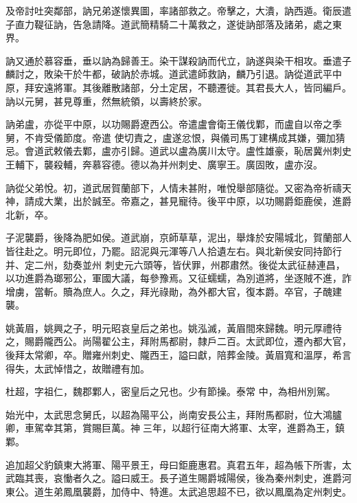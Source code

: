 \begin{pinyinscope}
 及帝討吐突鄰部，訥兄弟遂懷異圖，率諸部救之。帝擊之，大潰，訥西遁。衛辰遣子直力鞮征訥，告急請降。道武簡精騎二十萬救之，遂徙訥部落及諸弟，處之東界。



 訥又通於慕容垂，垂以訥為歸善王。染干謀殺訥而代立，訥遂與染干相攻。垂遣子麟討之，敗染干於牛都，破訥於赤城。道武遣師救訥，麟乃引退。訥從道武平中原，拜安遠將軍。其後離散諸部，分土定居，不聽遷徙。其君長大人，皆同編戶。訥以元舅，甚見尊重，然無統領，以壽終於家。



 訥弟盧，亦從平中原，以功賜爵遼西公。帝遣盧會衛王儀伐鄴，而盧自以帝之季舅，不肯受儀節度。帝遣
 使切責之，盧遂忿恨，與儀司馬丁建構成其嫌，彌加猜忌。會道武敕儀去鄴，盧亦引歸。道武以盧為廣川太守。盧性雄豪，恥居冀州刺史王輔下，襲殺輔，奔慕容德。德以為并州刺史、廣寧王。廣固敗，盧亦沒。



 訥從父弟悅。初，道武居賀蘭部下，人情未甚附，唯悅舉部隨從。又密為帝祈禱天神，請成大業，出於誠至。帝嘉之，甚見寵待。後平中原，以功賜爵鉅鹿侯，進爵北新，卒。



 子泥襲爵，後降為肥如侯。道武崩，京師草草，泥出，舉烽於安陽城北，賀蘭部人皆往赴之。明元即位，乃罷。詔泥與元渾等八人拾遺左右。與北新侯安同持節行并、定二州，劾奏並州
 刺史元六頭等，皆伏罪，州郡肅然。後從太武征赫連昌，以功進爵為瑯邪公，軍國大議，每參豫焉。又征蠕蠕，為別道將，坐逐賊不進，詐增虜，當斬。贖為庶人。久之，拜光祿勛，為外都大官，復本爵。卒官，子醜建襲。



 姚黃眉，姚興之子，明元昭哀皇后之弟也。姚泓滅，黃眉間來歸魏。明元厚禮待之，賜爵隴西公。尚陽翟公主，拜附馬都尉，隸戶二百。太武即位，遷內都大官，後拜太常卿，卒。贈雍州刺史、隴西王，謚曰獻，陪葬金陵。黃眉寬和溫厚，希言得失，太武悼惜之，故贈禮有加。



 杜超，字祖仁，魏郡鄴人，密皇后之兄也。少有節操。泰常
 中，為相州別駕。



 始光中，太武思念舅氏，以超為陽平公，尚南安長公主，拜附馬都尉，位大鴻臚卿，車駕幸其第，賞賜巨萬。神三年，以超行征南大將軍、太宰，進爵為王，鎮鄴。



 追加超父豹鎮東大將軍、陽平景王，母曰鉅鹿惠君。真君五年，超為帳下所害，太武臨其喪，哀慟者久之。謚曰威王。長子道生賜爵城陽侯，後為秦州刺史，進爵河東公。道生弟鳳凰襲爵，加侍中、特進。太武追思超不已，欲以鳳凰為定州刺史。




\end{pinyinscope}
